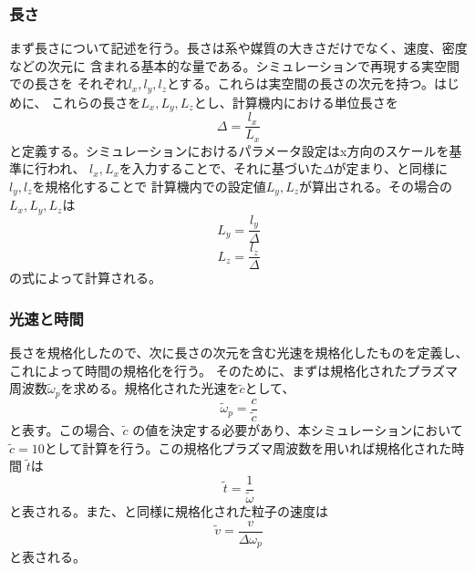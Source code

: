 \documentclass[a4paper,11pt,titlepage]{jsarticle}
\begin{document}
  \subsubsection{長さ}
  まず長さについて記述を行う。長さは系や媒質の大きさだけでなく、速度、密度などの次元に
  含まれる基本的な量である。シミュレーションで再現する実空間での長さを
  それぞれ$l_x,l_y,l_z$とする。これらは実空間の長さの次元を持つ。はじめに、
  これらの長さを$L_x,L_y,L_z$とし、計算機内における単位長さを
  \begin{equation}
    \label{eq:3-2-1}
    \Delta = \frac{l_x}{L_x}
  \end{equation}
  と定義する。シミュレーションにおけるパラメータ設定はx方向のスケールを基準に行われ、
  $l_x,L_x$を入力することで、それに基づいた$\Delta$が定まり、と同様に$l_y,l_z$を規格化することで
  計算機内での設定値$L_y,L_z$が算出される。その場合の$L_x,L_y,L_z$は
  \begin{equation}
    \label{eq:3-2-2}
    L_y=\frac{l_y}{\Delta}
  \end{equation}
  \begin{equation}
    \label{eq:3-2-3}
    L_z=\frac{l_z}{\Delta}
  \end{equation}
  の式によって計算される。\\
  \subsubsection{光速と時間}
  長さを規格化したので、次に長さの次元を含む光速を規格化したものを定義し、これによって時間の規格化を行う。
  そのために、まずは規格化されたプラズマ周波数$\tilde \omega_p$を求める。規格化された光速を$\tilde c$として、
  \begin{equation}
    \label{eq:3-2-4}
    \tilde \omega_p = \frac{c}{\tilde c}
  \end{equation}
  と表す。この場合、$\tilde c$ の値を決定する必要があり、本シミュレーションにおいて
  $\tilde c=10$として計算を行う。この規格化プラズマ周波数を用いれば規格化された時間
  $\tilde t$は
  \begin{equation}
    \label{eq:3-2-5}
    \tilde t=\frac{1}{\tilde \omega}
  \end{equation}
  と表される。また、と同様に規格化された粒子の速度は
  \begin{equation}
    \label{eq:3-2-6}
    \tilde v=\frac{v}{\Delta \omega_p}
  \end{equation}
  と表される。\\
\end{document}
